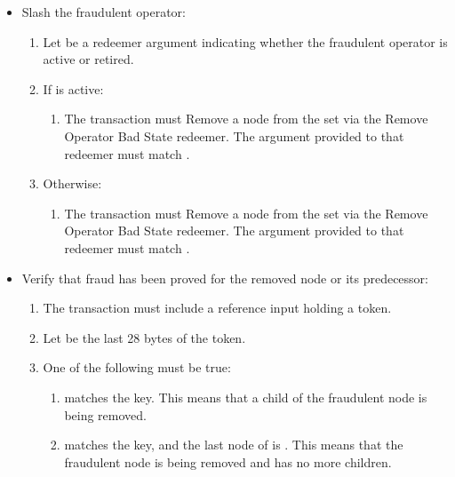 \documentclass[../midgard.tex]{subfiles}
\begin{document}
\begin{description}
\begin{itemize}
        \item Slash the fraudulent operator:
        \begin{enumerate}[resume]
            \item Let  be a redeemer argument indicating whether the fraudulent operator is active or retired.
            \item If  is active:
                \begin{enumerate}
                    \item The transaction must Remove a node from the  set via the Remove Operator Bad State redeemer.
                      The  argument provided to that redeemer must match .
                \end{enumerate}
            \item Otherwise:
                \begin{enumerate}
                    \item The transaction must Remove a node from the  set via the Remove Operator Bad State redeemer.
                      The  argument provided to that redeemer must match .
                \end{enumerate}
        \end{enumerate}

        \item Verify that fraud has been proved for the removed node or its predecessor:
        \begin{enumerate}[resume]
            \item The transaction must include a reference input holding a  token.
            \item Let  be the last 28 bytes of the  token.
            \item One of the following must be true:
                \begin{enumerate}
                    \item {} matches the  key.
                      This means that a child of the fraudulent node is being removed.
                    \item {} matches the  key, and the last node of  is .
                      This means that the fraudulent node is being removed and has no more children.
                \end{enumerate}
        \end{enumerate}
    \end{itemize}
\end{description}
\end{document}
